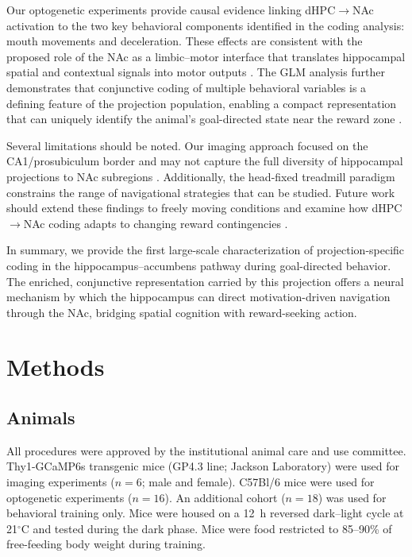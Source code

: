 \documentclass[11pt]{article}
\begin{document}
Our optogenetic experiments provide causal evidence linking dHPC$\to$NAc activation to the two key behavioral components identified in the coding analysis: mouth movements and deceleration. These effects are consistent with the proposed role of the NAc as a limbic--motor interface that translates hippocampal spatial and contextual signals into motor outputs \citep{Mogenson1980,Britt2012,Stuber2011}. The GLM analysis further demonstrates that conjunctive coding of multiple behavioral variables is a defining feature of the projection population, enabling a compact representation that can uniquely identify the animal's goal-directed state near the reward zone \citep{Hardcastle2017,Rigotti2013}.

Several limitations should be noted. Our imaging approach focused on the CA1/prosubiculum border and may not capture the full diversity of hippocampal projections to NAc subregions \citep{Groenewegen1987,French2003}. Additionally, the head-fixed treadmill paradigm constrains the range of navigational strategies that can be studied. Future work should extend these findings to freely moving conditions and examine how dHPC$\to$NAc coding adapts to changing reward contingencies \citep{Gauthier2018}.

In summary, we provide the first large-scale characterization of projection-specific coding in the hippocampus--accumbens pathway during goal-directed behavior. The enriched, conjunctive representation carried by this projection offers a neural mechanism by which the hippocampus can direct motivation-driven navigation through the NAc, bridging spatial cognition with reward-seeking action.

\section{Methods}

\subsection{Animals}

All procedures were approved by the institutional animal care and use committee. Thy1-GCaMP6s transgenic mice (GP4.3 line; Jackson Laboratory) were used for imaging experiments ($n = 6$; male and female). C57Bl/6 mice were used for optogenetic experiments ($n = 16$). An additional cohort ($n = 18$) was used for behavioral training only. Mice were housed on a 12~h reversed dark--light cycle at 21$^\circ$C and tested during the dark phase. Mice were food restricted to 85--90\% of free-feeding body weight during training.
\end{document}
